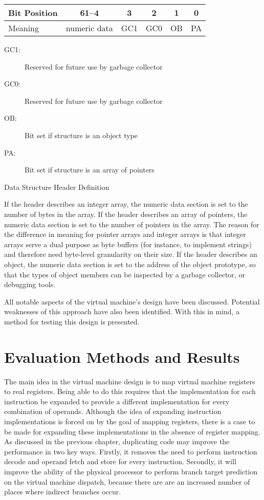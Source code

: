 		\begin{myfigure}
			\begin{tabular}{|l|c| c| c|c|c|}
				\hline
				Bit Position & 61--4 & 3 & 2 & 1 & 0 \\
				\hline
				Meaning & numeric data & GC1 & GC0 & OB & PA \\
				\hline
			\end{tabular}
			\newline
			\begin{description}
				\item[GC1:] Reserved for future use by garbage collector
				\item[GC0:] Reserved for future use by garbage collector
				\item[OB:] Bit set if structure is an object type
				\item[PA:] Bit set if structure is an array of pointers
			\end{description}
			
			\caption{Data Structure Header Definition}
			\label{fig:objheader}
		\end{myfigure}
		
		If the header describes an integer array, the numeric data section is set to the number of bytes in the array. If the header describes an array of pointers, the numeric data section is set to the number of pointers in the array. The reason for the difference in meaning for pointer arrays and integer arrays is that integer arrays serve a dual purpose as byte buffers (for instance, to implement strings) and therefore need byte-level granularity on their size. If the header describes an object, the numeric data section is set to the address of the object prototype, so that the types of object members can be inspected by a garbage collector, or debugging tools.
		
		All notable aspects of the virtual machine's design have been discussed. Potential weaknesses of this approach have also been identified. With this in mind, a method for testing this design is presented.

\chapter{Evaluation Methods and Results}
	The main idea in the virtual machine design is to map virtual machine registers to real registers. Being able to do this requires that the implementation for each instruction be expanded to provide a different implementation for every combination of operands. Although the idea of expanding instruction implementations is forced on by the goal of mapping registers, there is a case to be made for expanding these implementations in the absence of register mapping. As discussed in the previous chapter, duplicating code may improve the performance in two key ways. Firstly, it removes the need to perform instruction decode and operand fetch and store for every instruction. Secondly, it will improve the ability of the physical processor to perform branch target prediction on the virtual machine dispatch, because there are are an increased number of places where indirect branches occur.
	
